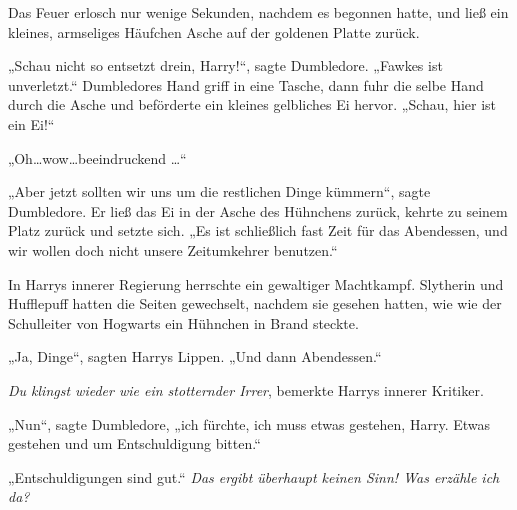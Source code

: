 Das Feuer erlosch nur wenige Sekunden, nachdem es begonnen hatte, und ließ ein kleines, armseliges Häufchen Asche auf der goldenen Platte zurück.

„Schau nicht so entsetzt drein, Harry!“, sagte Dumbledore. „Fawkes ist unverletzt.“ Dumbledores Hand griff in eine Tasche, dann fuhr die selbe Hand durch die Asche und beförderte ein kleines gelbliches Ei hervor. „Schau, hier ist ein Ei!“

„Oh…wow…beeindruckend …“

„Aber jetzt sollten wir uns um die restlichen Dinge kümmern“, sagte Dumbledore. Er ließ das Ei in der Asche des Hühnchens zurück, kehrte zu seinem Platz zurück und setzte sich. „Es ist schließlich fast Zeit für das Abendessen, und wir wollen doch nicht unsere Zeitumkehrer benutzen.“

In Harrys innerer Regierung herrschte ein gewaltiger Machtkampf. Slytherin und Hufflepuff hatten die Seiten gewechselt, nachdem sie gesehen hatten, wie wie der Schulleiter von Hogwarts ein Hühnchen in Brand steckte.

„Ja, Dinge“, sagten Harrys Lippen. „Und dann Abendessen.“

\emph{Du klingst wieder wie ein stotternder Irrer}, bemerkte Harrys innerer Kritiker.

„Nun“, sagte Dumbledore, „ich fürchte, ich muss etwas gestehen, Harry. Etwas gestehen und um Entschuldigung bitten.“

„Entschuldigungen sind gut.“ \emph{Das ergibt überhaupt keinen Sinn! Was erzähle ich da?}

